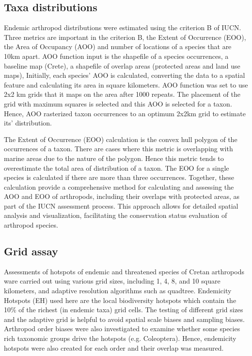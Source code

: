     \subsection{Taxa distributions}
    \label{subsec:arthropods-eoo-aoo}

Endemic arthropod distributions were estimated using the criterion B of IUCN. 
Three metrics are important in the criterion B, the Extent of Occurrence (EOO),
the Area of Occupancy (AOO) and 
number of locations of a species that are 10km apart.
AOO function input is the shapefile of a species occurrences,
a baseline map (Crete), a shapefile of overlap areas (protected areas and land use maps),
Initially, each species' AOO is calculated, converting the data to a spatial feature
and calculating its area in square kilometers. 
AOO function was set to use 2x2 km grids that it maps on the area after 1000
repeats. The placement of the grid with maximum squares is selected and this AOO 
is selected for a taxon. Hence, AOO rasterized taxon occurrences to an optimum 
2x2km grid to estimate its' distribution.

The Extent of Occurrence (EOO) calculation is the convex hull polygon of the occurrences 
of a taxon. There are cases where this metric is overlapping with marine areas due 
to the nature of the polygon. Hence this metric tends to overestimate the 
total area of distribution of a taxon.
The EOO for a single species is calculated if there are more than three occurrences.
Together, these calculation provide a comprehensive method for calculating and
assessing the AOO and EOO of arthropods, including their overlaps with protected
areas, as part of the IUCN assessment process. This approach allows for detailed
spatial analysis and visualization, facilitating the conservation status evaluation of arthropod species.


    \subsection{Grid assay}
    \label{subsec:arthropods-ehs-kbas}

    Assessments of hotspots of endemic and threatened species of Cretan arthropods
ware carried out using various grid sizes, including 1, 4, 8, and 10 square kilometers, and
adaptive resolution algorithms such as quadtree. 
Endemicity Hotspots (EH) used here are the local biodiversity hotspots which contain
the 10\% of the richest (in endemic taxa) grid cells.
The testing of different grid sizes and the adaptive grid is helpful to avoid 
spatial scale biases and sampling biases.
Arthropod order biases were also investigated to examine whether some species
rich taxonomic groups drive the hotspots (e.g. Coleoptera). Hence, endemicity 
hotspots were also created for each order and their overlap was measured.

